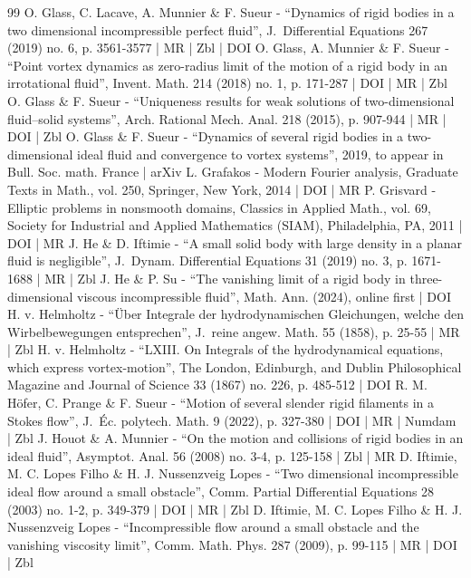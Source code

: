 \documentclass[10pt]{amsart}
\theoremstyle{definition}
\begin{document}
\begin{thebibliography}{99}
O. Glass, C. Lacave, A. Munnier \& F. Sueur - “Dynamics of rigid bodies in a two dimensional incompressible perfect fluid”, J. Differential Equations 267 (2019) no. 6, p. 3561-3577 | MR | Zbl | DOI
O. Glass, A. Munnier \& F. Sueur - “Point vortex dynamics as zero-radius limit of the motion of a rigid body in an irrotational fluid”, Invent. Math. 214 (2018) no. 1, p. 171-287 | DOI | MR | Zbl
O. Glass \& F. Sueur - “Uniqueness results for weak solutions of two-dimensional fluid–solid systems”, Arch. Rational Mech. Anal. 218 (2015), p. 907-944 | MR | DOI | Zbl
O. Glass \& F. Sueur - “Dynamics of several rigid bodies in a two-dimensional ideal fluid and convergence to vortex systems”, 2019, to appear in Bull. Soc. math. France | arXiv
L. Grafakos - Modern Fourier analysis, Graduate Texts in Math., vol. 250, Springer, New York, 2014 | DOI | MR
P. Grisvard - Elliptic problems in nonsmooth domains, Classics in Applied Math., vol. 69, Society for Industrial and Applied Mathematics (SIAM), Philadelphia, PA, 2011 | DOI | MR
J. He \& D. Iftimie - “A small solid body with large density in a planar fluid is negligible”, J. Dynam. Differential Equations 31 (2019) no. 3, p. 1671-1688 | MR | Zbl
J. He \& P. Su - “The vanishing limit of a rigid body in three-dimensional viscous incompressible fluid”, Math. Ann. (2024), online first | DOI
H. v. Helmholtz - “Über Integrale der hydrodynamischen Gleichungen, welche den Wirbelbewegungen entsprechen”, J. reine angew. Math. 55 (1858), p. 25-55 | MR | Zbl
H. v. Helmholtz - “LXIII. On Integrals of the hydrodynamical equations, which express vortex-motion”, The London, Edinburgh, and Dublin Philosophical Magazine and Journal of Science 33 (1867) no. 226, p. 485-512 | DOI
R. M. Höfer, C. Prange \& F. Sueur - “Motion of several slender rigid filaments in a Stokes flow”, J. Éc. polytech. Math. 9 (2022), p. 327-380 | DOI | MR | Numdam | Zbl
J. Houot \& A. Munnier - “On the motion and collisions of rigid bodies in an ideal fluid”, Asymptot. Anal. 56 (2008) no. 3-4, p. 125-158 | Zbl | MR
D. Iftimie, M. C. Lopes Filho \& H. J. Nussenzveig Lopes - “Two dimensional incompressible ideal flow around a small obstacle”, Comm. Partial Differential Equations 28 (2003) no. 1-2, p. 349-379 | DOI | MR | Zbl
D. Iftimie, M. C. Lopes Filho \& H. J. Nussenzveig Lopes - “Incompressible flow around a small obstacle and the vanishing viscosity limit”, Comm. Math. Phys. 287 (2009), p. 99-115 | MR | DOI | Zbl

\end{thebibliography}
\end{document}
